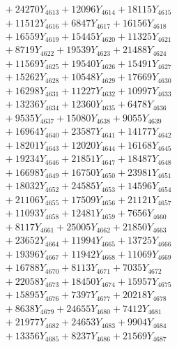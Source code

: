 \documentclass[a4paper,10pt]{article}
\begin{document}
{\begin{align}
&\;  + 24270 Y_{4613} + 12096 Y_{4614} + 18115 Y_{4615} \\[0.3ex]
&\;  + 11512 Y_{4616} + 6847 Y_{4617} + 16156 Y_{4618} \\[0.5ex]\allowbreak
&\;  + 16559 Y_{4619} + 15445 Y_{4620} + 11325 Y_{4621} \\[0.3ex]
&\;  + 8719 Y_{4622} + 19539 Y_{4623} + 21488 Y_{4624} \\[0.3ex]
&\;  + 11569 Y_{4625} + 19540 Y_{4626} + 15491 Y_{4627} \\[0.3ex]
&\;  + 15262 Y_{4628} + 10548 Y_{4629} + 17669 Y_{4630} \\[0.3ex]
&\;  + 16298 Y_{4631} + 11227 Y_{4632} + 10997 Y_{4633} \\[0.3ex]
&\;  + 13236 Y_{4634} + 12360 Y_{4635} + 6478 Y_{4636} \\[0.3ex]
&\;  + 9535 Y_{4637} + 15080 Y_{4638} + 9055 Y_{4639} \\[0.3ex]
&\;  + 16964 Y_{4640} + 23587 Y_{4641} + 14177 Y_{4642} \\[0.3ex]
&\;  + 18201 Y_{4643} + 12020 Y_{4644} + 16168 Y_{4645} \\[0.3ex]
&\;  + 19234 Y_{4646} + 21851 Y_{4647} + 18487 Y_{4648} \\[0.5ex]\allowbreak
&\;  + 16698 Y_{4649} + 16750 Y_{4650} + 23981 Y_{4651} \\[0.3ex]
&\;  + 18032 Y_{4652} + 24585 Y_{4653} + 14596 Y_{4654} \\[0.3ex]
&\;  + 21106 Y_{4655} + 17509 Y_{4656} + 21121 Y_{4657} \\[0.3ex]
&\;  + 11093 Y_{4658} + 12481 Y_{4659} + 7656 Y_{4660} \\[0.3ex]
&\;  + 8117 Y_{4661} + 25005 Y_{4662} + 21850 Y_{4663} \\[0.3ex]
&\;  + 23652 Y_{4664} + 11994 Y_{4665} + 13725 Y_{4666} \\[0.3ex]
&\;  + 19396 Y_{4667} + 11942 Y_{4668} + 11069 Y_{4669} \\[0.3ex]
&\;  + 16788 Y_{4670} + 8113 Y_{4671} + 7035 Y_{4672} \\[0.3ex]
&\;  + 22058 Y_{4673} + 18450 Y_{4674} + 15957 Y_{4675} \\[0.3ex]
&\;  + 15895 Y_{4676} + 7397 Y_{4677} + 20218 Y_{4678} \\[0.5ex]\allowbreak
&\;  + 8638 Y_{4679} + 24655 Y_{4680} + 7412 Y_{4681} \\[0.3ex]
&\;  + 21977 Y_{4682} + 24653 Y_{4683} + 9904 Y_{4684} \\[0.3ex]
&\;  + 13356 Y_{4685} + 8237 Y_{4686} + 21569 Y_{4687} \\[0.3ex]

\end{align}}
\end{document}
